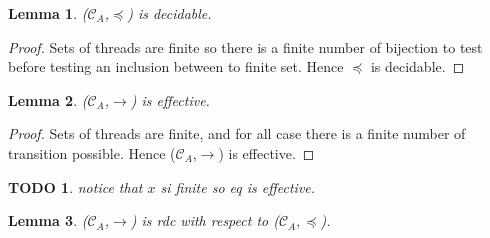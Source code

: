 \documentclass[a4paper,10pt]{report}
\newtheorem{lm}{Lemma}[thr]
\newtheorem{td}{TODO}
\newcommand{\C}{\mathcal{C}_{A}}
\begin{document}
\begin{lm} \label{cd2}
  ($\C$,$\preceq$) is decidable.
\end{lm}
\begin{proof}
  Sets of threads are finite so there is a finite number of bijection to test before testing an inclusion between to finite set.
  Hence $\preceq$ is decidable.
\end{proof}

\begin{lm} \label{cd3}
  ($\C$,$\rightarrow$) is effective.
\end{lm}

\begin{proof}
   Sets of threads are finite, and for all case there is a finite number of transition possible.
   Hence   ($\C$,$\rightarrow$) is effective.
\end{proof}
\begin{td}
 notice that $x$ si finite so eq is effective. 
\end{td}

\begin{lm} \label{cd4}
  ($\C$,$\rightarrow$) is rdc with respect to ($\C,\preceq$).
\end{lm}
\end{document}
